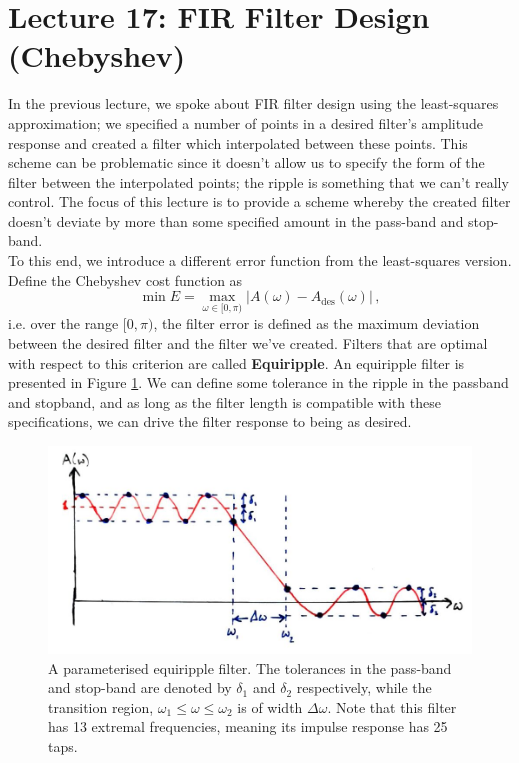 \section{Lecture 17: FIR Filter Design (Chebyshev)}

In the previous lecture, we spoke about FIR filter design using the
least-squares approximation; we specified a number of points in
a desired filter's amplitude response and created a filter which
interpolated between these points. This scheme can be problematic
since it doesn't allow us to specify the form of the filter
between the interpolated points; the ripple is something that we
can't really control. The focus of this lecture is to provide a
scheme whereby the created filter doesn't deviate by more than
some specified amount in the pass-band and stop-band.\\
%
To this end, we introduce a different error function from the
least-squares version. Define the Chebyshev cost function as
%
\begin{displaymath}
  \min E = \max_{\omega\in[0,\pi)} \lvert A(\omega) - A_\mathrm{des}(\omega)\rvert \,,
\end{displaymath}
%
i.e. over the range $[0,\pi)$, the filter error is defined as the
maximum deviation between the desired filter and the filter we've
created. Filters that are optimal with respect to this criterion
are called \textbf{Equiripple}. An equiripple filter is presented
in Figure \ref{fig::lecture_17_equiripple}. We can define some
tolerance in the ripple in the
passband and stopband, and as long as the filter length is
compatible with these specifications, we can drive the filter
response to being as desired.\\
%
\begin{figure}[H]
  \includegraphics[width=\textwidth]{images/lecture_17_equiripple.JPG}
  \caption{A parameterised equiripple filter. The tolerances in the
    pass-band and stop-band are denoted by $\delta_1$ and $\delta_2$
    respectively, while the transition region, $\omega_1\leq\omega\leq\omega_2$
    is of width $\Delta\omega$. Note that this filter has 13
    extremal frequencies, meaning its impulse response has 25 taps.
  }
  \label{fig::lecture_17_equiripple}
\end{figure}
